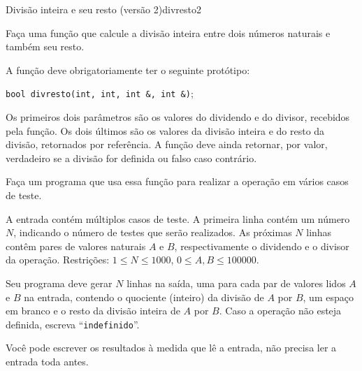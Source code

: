\documentclass[12pt,a4paper,oneside]{article}
\begin{document}
\begin{problem}{Divisão inteira e seu resto (versão 2)}{divresto}{2}

Faça uma função que calcule a divisão inteira entre dois números naturais e também seu resto.

A função deve obrigatoriamente ter o seguinte protótipo:

\texttt{\textcolor{Mulberry}{bool} divresto(\textcolor{Mulberry}{int}, \textcolor{Mulberry}{int}, \textcolor{Mulberry}{int \&}, \textcolor{Mulberry}{int \&})};

Os primeiros dois parâmetros são os valores do dividendo e do divisor, recebidos pela função. Os dois últimos são os valores da divisão inteira e do resto da divisão, retornados por referência. A função deve ainda retornar, por valor, verdadeiro se a divisão for definida ou falso caso contrário.

Faça um programa que usa essa função para realizar a operação em vários casos de teste.

%

\InputFile

A entrada contém múltiplos casos de teste. A primeira linha contém um número $N$, indicando o número de testes que serão realizados. As próximas $N$ linhas contêm pares de valores naturais $A$ e $B$, respectivamente o dividendo e o divisor da operação. Restrições: $1 \leq N \leq 1000$, $0 \leq A,B \leq 100000$.

\OutputFile

Seu programa deve gerar $N$ linhas na saída, uma para cada par de valores lidos $A$ e $B$ na entrada, contendo o quociente (inteiro) da divisão de $A$ por $B$, um espaço em branco e o resto da divisão inteira de $A$ por $B$. Caso a operação não esteja definida, escreva ``\texttt{indefinido}''.


 \Notes
Você pode escrever os resultados à medida que lê a entrada, não precisa ler a entrada toda antes.

\Example

\begin{example}
%
\end{example}



\end{problem}
\end{document}
